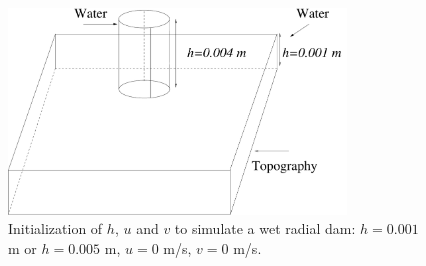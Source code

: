 \documentclass[a4paper, 11pt]{article}
\begin{document}
\begin{figure}[htbp]
\begin{center}
\includegraphics[width=0.8\textwidth]{Figures_FullSWOF_2D/Radial_dam_wet}
\caption{Initialization of $h$, $u$ and $v$  to simulate a wet radial dam: 
$h=0.001$ m or $h=0.005$ m, $u=0$ m/s, $v=0$ m/s.}
\label{fig:Radial_dam_wet}
\end{center}
\end{figure}
\end{document}
